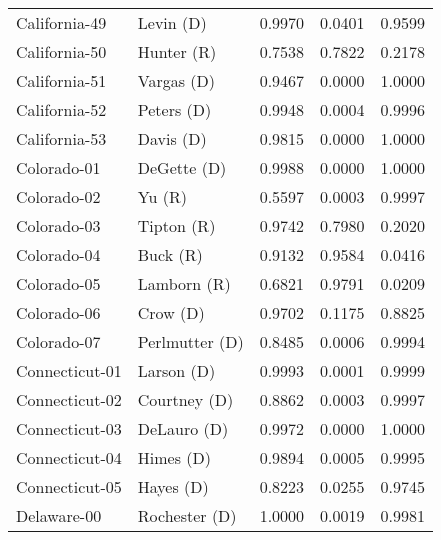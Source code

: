 \begin{longtable}{llrll}
     California-49 &            {\color{Blue} Levin (D)} &       0.9970 &        0.0401 &        0.9599 \\
     California-50 &            {\color{Red} Hunter (R)} &       0.7538 &        0.7822 &        0.2178 \\
     California-51 &           {\color{Blue} Vargas (D)} &       0.9467 &        0.0000 &        1.0000 \\
     California-52 &           {\color{Blue} Peters (D)} &       0.9948 &        0.0004 &        0.9996 \\
     California-53 &            {\color{Blue} Davis (D)} &       0.9815 &        0.0000 &        1.0000 \\
       Colorado-01 &          {\color{Blue} DeGette (D)} &       0.9988 &        0.0000 &        1.0000 \\
       Colorado-02 &                {\color{Red} Yu (R)} &       0.5597 &        0.0003 &        0.9997 \\
       Colorado-03 &            {\color{Red} Tipton (R)} &       0.9742 &        0.7980 &        0.2020 \\
       Colorado-04 &              {\color{Red} Buck (R)} &       0.9132 &        0.9584 &        0.0416 \\
       Colorado-05 &           {\color{Red} Lamborn (R)} &       0.6821 &        0.9791 &        0.0209 \\
       Colorado-06 &             {\color{Blue} Crow (D)} &       0.9702 &        0.1175 &        0.8825 \\
       Colorado-07 &       {\color{Blue} Perlmutter (D)} &       0.8485 &        0.0006 &        0.9994 \\
    Connecticut-01 &           {\color{Blue} Larson (D)} &       0.9993 &        0.0001 &        0.9999 \\
    Connecticut-02 &         {\color{Blue} Courtney (D)} &       0.8862 &        0.0003 &        0.9997 \\
    Connecticut-03 &          {\color{Blue} DeLauro (D)} &       0.9972 &        0.0000 &        1.0000 \\
    Connecticut-04 &            {\color{Blue} Himes (D)} &       0.9894 &        0.0005 &        0.9995 \\
    Connecticut-05 &            {\color{Blue} Hayes (D)} &       0.8223 &        0.0255 &        0.9745 \\
       Delaware-00 &        {\color{Blue} Rochester (D)} &       1.0000 &        0.0019 &        0.9981 \\

\end{longtable}
